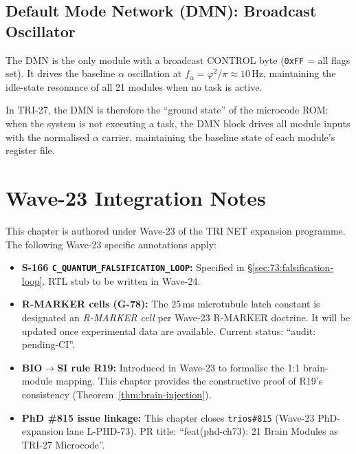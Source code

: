 \subsection{Default Mode Network (DMN): Broadcast Oscillator}
\label{sec:73:ext-dmn}

The DMN is the only module with a broadcast CONTROL byte
(\texttt{0xFF} = all flags set).
It drives the baseline $\alpha$ oscillation at
$f_\alpha = \varphi^{2}/\pi \approx 10\,\mathrm{Hz}$,
maintaining the idle-state resonance of all 21 modules when
no task is active.

In TRI-27, the DMN is therefore the ``ground state'' of the
microcode ROM: when the system is not executing a task,
the DMN block drives all module inputs with the normalised
$\alpha$ carrier, maintaining the baseline state of each
module's register file.

\section{Wave-23 Integration Notes}
\label{sec:73:wave23}

This chapter is authored under Wave-23 of the TRI NET expansion
programme.
The following Wave-23 specific annotations apply:

\begin{itemize}
  \item \textbf{S-166 \texttt{C\_QUANTUM\_FALSIFICATION\_LOOP}:}
    Specified in §\ref{sec:73:falsification-loop}.
    RTL stub to be written in Wave-24.

  \item \textbf{R-MARKER cells (G-78):}
    The 25\,ms microtubule latch constant is designated an
    \emph{R-MARKER cell} per Wave-23 R-MARKER doctrine.
    It will be updated once experimental data are available.
    Current status: ``audit: pending-CI''.

  \item \textbf{BIO$\to$SI rule R19:}
    Introduced in Wave-23 to formalise the 1:1 brain-module
    mapping.
    This chapter provides the constructive proof of R19's
    consistency (Theorem~\ref{thm:brain-injection}).

  \item \textbf{PhD \#815 issue linkage:}
    This chapter closes \texttt{trios\#815} (Wave-23 PhD-expansion
    lane L-PHD-73).
    PR title: ``feat(phd-ch73): 21 Brain Modules as TRI-27 Microcode''.
\end{itemize}

